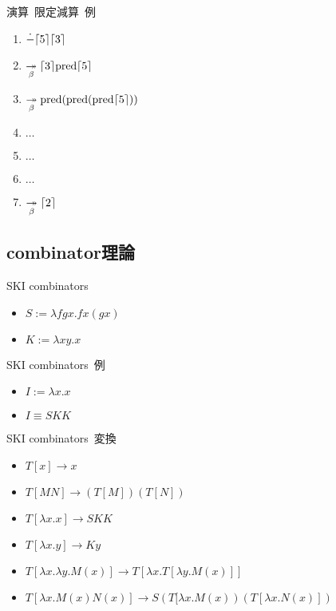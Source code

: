 \documentclass[pdflatex,17pt]{beamer}
\begin{document}
\begin{frame}{演算~限定減算~例}
    \begin{enumerate}
        \item $\dot{-}\lceil 5 \rceil\lceil 3 \rceil$
        \pause
        \item $\underset{\beta}{\twoheadrightarrow} \lceil 3 \rceil{\rm pred}\lceil 5 \rceil$
        \pause
        \item $\underset{\beta}{\twoheadrightarrow} {\rm pred}({\rm pred}({\rm pred}\lceil 5 \rceil))$
        \pause
        \item $\dots$
        \pause
        \item $\dots$
        \pause
        \item $\dots$
        \pause
        \item $\underset{\beta}{\twoheadrightarrow} \lceil 2 \rceil$
    \end{enumerate}
\end{frame}

\subsection{combinator理論}
\begin{frame}{SKI combinators}
    \begin{itemize}
        \item $S := \lambda f g x. f x (g x)$
        \item $K := \lambda x y. x$
    \end{itemize}
\end{frame}

\begin{frame}{SKI combinators~例}
    \begin{itemize}
        \item $I := \lambda x. x$
        \item $I \equiv SKK$
    \end{itemize}
\end{frame}

\begin{frame}{SKI combinators~変換}
    \begin{itemize}
        \item $T[x] \to x$
        \item $T[MN] \to (T[M])(T[N])$
        \item $T[\lambda x. x] \to SKK$
        \item $T[\lambda x. y] \to Ky$
        \item $T[\lambda x. \lambda y. M(x)] \to T[\lambda x. T[\lambda y. M(x)]]$
        \item $T[\lambda x. M(x)N(x)] \to S(T[\lambda x. M(x))(T[\lambda x. N(x)])$
    \end{itemize}
\end{frame}
\end{document}
